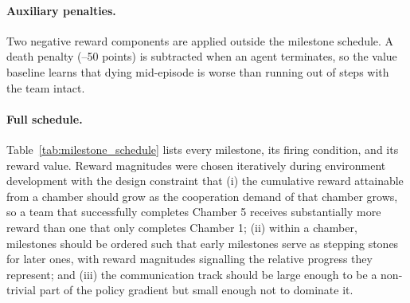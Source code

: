 \documentclass{article}
\theoremstyle{plain}
\theoremstyle{definition}
\theoremstyle{remark}
\begin{document}
\paragraph{Auxiliary penalties.}
Two negative reward components are applied outside the milestone schedule. A death penalty (--50 points) is subtracted when an agent terminates, so the value baseline learns that dying mid-episode is worse than running out of steps with the team intact. 

\paragraph{Full schedule.}
Table~\ref{tab:milestone_schedule} lists every milestone, its firing condition, and its reward value. Reward magnitudes were chosen iteratively during environment development with the design constraint that (i) the cumulative reward attainable from a chamber should grow as the cooperation demand of that chamber grows, so a team that successfully completes Chamber 5 receives substantially more reward than one that only completes Chamber 1; (ii) within a chamber, milestones should be ordered such that early milestones serve as stepping stones for later ones, with reward magnitudes signalling the relative progress they represent; and (iii) the communication track should be large enough to be a non-trivial part of the policy gradient but small enough not to dominate it.
\end{document}
